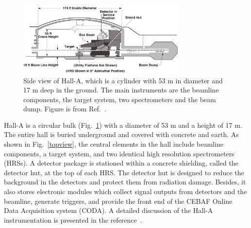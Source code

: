 \begin{figure}[!ht]
 \begin{center}
  \includegraphics[width=0.75\textwidth]{./figures/halla_jlab/HallA}
  \caption[Side view of Hall-A]{Side view of Hall-A, which is a cylinder with 53 m in diameter and 17 m deep in the ground. The main instruments are the beamline components, the target system, two spectrometers and the beam dump. Figure is from Ref.~\cite{halla_nim}.}
  \label{sideview}
 \end{center}
\end{figure}
 Hall-A is a circular bulk (Fig.~\ref{sideview}) with a diameter of 53 m and a height of 17 m. The entire hall is buried underground and covered with concrete and earth. As shown in Fig.~\ref{topview}, the central elements in the hall include beamline components, a target system, and two identical high resolution spectrometers (HRSs). A detector package is stationed within a concrete shielding, called the detector hut, at the top of each HRS. The detector hut is designed to reduce the background in the detectors and protect them from radiation damage. Besides, it also stores electronic modules which collect signal outputs from detectors and the beamline, generate triggers, and provide the front end of the CEBAF Online Data Acquisition system (CODA). A detailed discussion of the Hall-A instrumentation is presented in the reference~\cite{halla_nim}.

